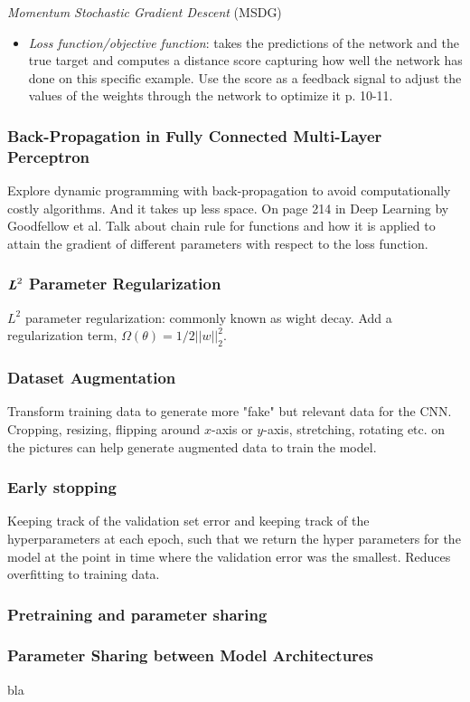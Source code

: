\documentclass[a4paper,11pt]{article}
\begin{document}
\textit{Momentum Stochastic Gradient Descent} (MSDG) \cite{Loizou2017}
\begin{itemize}
\item \textit{Loss function/objective function}: takes the predictions of the network and the true target and computes a distance score capturing how well the network has done on this specific example. Use the score as a feedback signal to adjust the values of the weights through the network to optimize it \cite{Chollet-et-al-2018} p. 10-11.
\end{itemize}
\subsubsection{Back-Propagation in Fully Connected Multi-Layer Perceptron}
Explore dynamic programming with back-propagation to avoid computationally costly algorithms. And it takes up less space. On page 214 in Deep Learning by Goodfellow et al. Talk about chain rule for functions and how it is applied to attain the gradient of different parameters with respect to the loss function. 
\subsubsection{$\textbf{\textit{L}}^2$ Parameter Regularization}
$L^2$ parameter regularization: commonly known as wight decay. Add a regularization term, $\Omega(\theta)=1/2||w||_2^2$. 
\subsubsection{Dataset Augmentation}
Transform training data to generate more "fake" but relevant data for the CNN. Cropping, resizing, flipping around $x$-axis or $y$-axis, stretching, rotating etc. on the pictures can help generate augmented data to train the model. 
\subsubsection{Early stopping}
Keeping track of the validation set error and keeping track of the hyperparameters at each epoch, such that we return the hyper parameters for the model at the point in time where the validation error was the smallest. Reduces overfitting to training data. 
\subsubsection{Pretraining and parameter sharing}
\subsubsection{Parameter Sharing between Model Architectures}
bla
\end{document}
